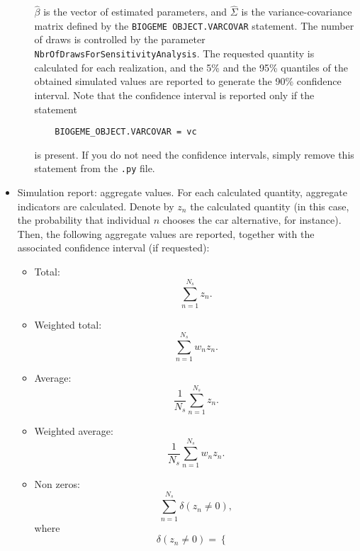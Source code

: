 \documentclass[12pt,a4paper]{article}
\begin{document}
\begin{itemize}
\begin{enumerate}
  $\widehat{\beta}$ is the vector of estimated parameters, and
  $\widehat{\Sigma}$ is the variance-covariance matrix defined by the
  \lstinline$BIOGEME OBJECT.VARCOVAR$ statement. The number of draws
  is controlled by the parameter
  \lstinline$NbrOfDrawsForSensitivityAnalysis$. The requested quantity
  is calculated for each realization, and the 5\% and the 95\%
  quantiles of the obtained simulated values are reported to generate
  the 90\% confidence interval.
  Note that the confidence interval is reported only if the statement
  \begin{lstlisting}
    BIOGEME_OBJECT.VARCOVAR = vc
  \end{lstlisting}
  is present. If you do not need the confidence intervals, simply
  remove this statement from the \lstinline$.py$ file.
\end{enumerate}
  \item Simulation report: aggregate values. For each calculated
    quantity, aggregate indicators are calculated. Denote by $z_n$ the
    calculated quantity (in this case, the probability that individual $n$ chooses
    the car alternative, for instance). Then, the following aggregate
    values are reported, together with the associated confidence
    interval (if requested):
    \begin{itemize}
    \item Total:
      \begin{equation}
\sum_{n=1}^{N_s} z_n.
      \end{equation}
    \item Weighted total:
      \begin{equation}
\sum_{n=1}^{N_s} w_n z_n.
      \end{equation}
    \item Average:
      \begin{equation}
\frac{1}{N_s}\sum_{n=1}^{N_s} z_n.
      \end{equation}
    \item Weighted average:
      \begin{equation}
\frac{1}{N_s}\sum_{n=1}^{N_s} w_n z_n.
      \end{equation}
    \item Non zeros:
      \begin{equation}
        \sum_{n=1}^{N_s} \delta(z_n \neq 0),
      \end{equation}
      where
      \begin{equation}
        \delta(z_n \neq 0) = \left\{
        \begin{array}{ll}

\end{array}
\end{equation}
\end{itemize}
\end{itemize}
\end{document}
